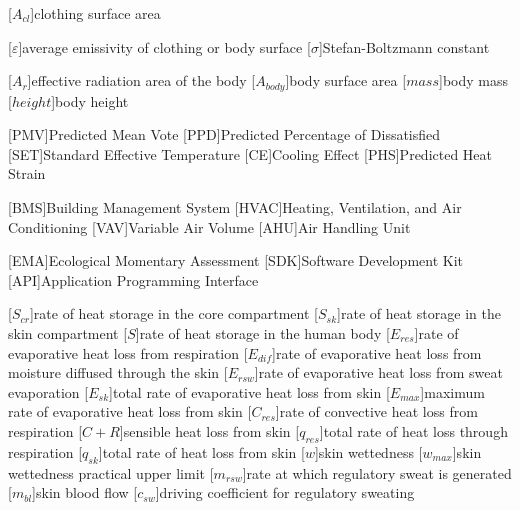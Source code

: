 \begin{acronym}[longest]
    [$A_{cl}$]{clothing surface area}

    [$\varepsilon$]{average emissivity of clothing or body surface}
    [$\sigma$]{Stefan-Boltzmann constant}

    [$A_{r}$]{effective  radiation  area  of  the  body}
    [$A_{body}$]{body surface area}
    [$mass$]{body mass}
    [$height$]{body height}

    [PMV]{Predicted Mean Vote}
    [PPD]{Predicted Percentage of Dissatisfied\acroextra{, \%}}
    [SET]{Standard Effective Temperature}
    [CE]{Cooling Effect}
    [PHS]{Predicted Heat Strain}

    [BMS]{Building Management System}
    [HVAC]{Heating, Ventilation, and Air Conditioning}
    [VAV]{Variable Air Volume}
    [AHU]{Air Handling Unit}

    [EMA]{Ecological Momentary Assessment}
    [SDK]{Software Development Kit}
    [API]{Application Programming Interface}

    [$S_{cr}$]{rate of heat storage in the core compartment}
    [$S_{sk}$]{rate of heat storage in the skin compartment}
    [$S$]{rate of heat storage in the human body}
    [$E_{res}$]{rate of evaporative heat loss from respiration}
    [$E_{dif}$]{rate of evaporative heat loss from moisture diffused through the skin}
    [$E_{rsw}$]{rate of evaporative heat loss from sweat evaporation}
    [$E_{sk}$]{total rate of evaporative heat loss from skin}
    [$E_{max}$]{maximum rate of evaporative heat loss from skin}
    [$C_{res}$]{rate of convective heat loss from respiration}
    [$C + R$]{sensible heat loss from skin}
    [$q_{res}$]{total rate of heat loss through respiration}
    [$q_{sk}$]{total rate of heat loss from skin}
    [$w$]{skin wettedness}
    [$w_{max}$]{skin wettedness practical upper limit}
    [$m_{rsw}$]{rate at which regulatory sweat is generated}
    [$m_{bl}$]{skin blood flow}
    [$c_{sw}$]{driving coefficient for regulatory sweating}


\end{acronym}
